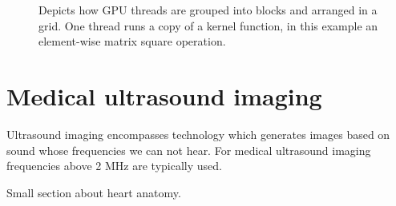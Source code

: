 \begin{figure}
\centering
{}
\caption{Depicts how GPU threads are grouped into blocks and arranged in a grid. One thread runs a copy of a kernel function, in this example an element-wise matrix square operation.}
\label{fig:gpu_grid}
\end{figure}

\section {Medical ultrasound imaging}\label{sec:ultrasound}
Ultrasound imaging encompasses technology which generates images based on sound whose frequencies we can not hear. For medical ultrasound imaging frequencies above 2 MHz are typically used.

Small section about heart anatomy.


